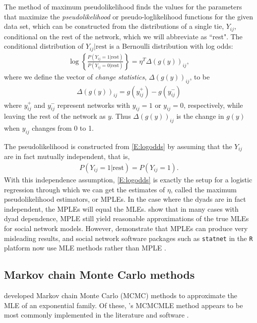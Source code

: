 The method of maximum pseudolikelihood finds the values for the parameters that maximize the \textit{pseudolikelihood} or pseudo-loglikelihood functions for the given data set, which can be constructed from the distributions of a single tie, $Y_{ij}$, conditional on the rest of the network, which we will abbreviate as ``rest".  The conditional distribution of $Y_{ij} | \textrm{rest}$ is a Bernoulli distribution with log odds:
\begin{align}
	\log \left \{ \frac{P( Y_{ij} =1 | \textrm{rest} ) }{ P( Y_{ij} =0 | \textrm{rest} ) } \right \} = \eta^T \Delta(g(y))_{ij}, \label{E:logodds}
\end{align}
where we define the vector of \textit{change statistics}, $\Delta(g(y))_{ij}$, to be
\begin{align*}
	\Delta(g(y))_{ij} = g(y_{ij}^+) - g(y_{ij}^-)
\end{align*}
where $y_{ij}^+$ and $y_{ij}^-$ represent networks with $y_{ij} = 1$ or $y_{ij} = 0$, respectively, while leaving the rest of the network as $y$.  Thus $\Delta(g(y))_{ij}$ is the change in $g(y)$ when $y_{ij}$ changes from 0 to 1.

The pseudolikelihood is constructed from \eqref{E:logodds} by assuming that the $Y_{ij}$ are in fact mutually independent, that is, 
\begin{align*}
	P( Y_{ij} =1 | \textrm{rest} ) = P( Y_{ij} =1 ).
\end{align*}
With this independence assumption, \eqref{E:logodds} is exactly the setup for a logistic regression through which we can get the estimates of $\eta$, called the maximum pseudolikelihood estimators, or MPLEs.  In the case where the dyads are in fact independent, the MPLEs will equal the MLEs.  \citet{Strauss:1990} show that in many cases with dyad dependence, MPLE still yield reasonable approximations of the true MLEs for social network models.  However, \citet{Geyer:1992, Snijders:2002, Duijn:2009} demonstrate that MPLEs can produce very misleading results, and social network software packages such as \texttt{statnet} in the \texttt{R} platform now use MLE methods rather than MPLE \citep{statnet:R}.  

\subsection{Markov chain Monte Carlo methods}
\citet{Geyer:1992, Corander:1998, Snijders:2002} developed Markov chain Monte Carlo (MCMC) methods to approximate the MLE of an exponential family.  Of these, \citeauthor{Geyer:1992}'s MCMCMLE method appears to be most commonly implemented in the literature and software \citep{Hunter:2006, Handcock:2006, ergm, statnet, GOF}.  

